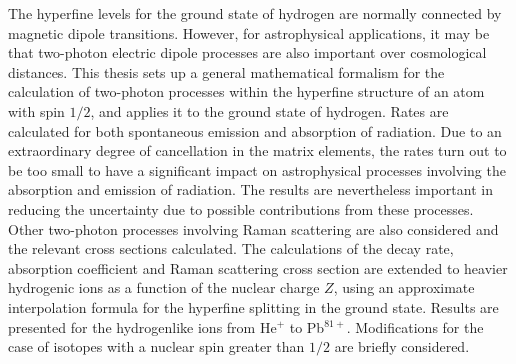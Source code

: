 \thispagestyle{plain}


The hyperfine levels for the ground state of hydrogen are normally connected by magnetic dipole transitions.  However, for astrophysical applications, it may be that two-photon electric dipole processes are also important over cosmological distances. This thesis sets up a general mathematical formalism for the calculation of two-photon processes within the hyperfine structure of an atom with spin $1/2$, and applies it to the ground state of hydrogen. Rates are calculated for both spontaneous emission and absorption of radiation. Due to an extraordinary degree of cancellation in the matrix elements, the rates turn out to be too small to have a significant impact on astrophysical processes involving the absorption and emission of radiation. The results are nevertheless important in reducing the uncertainty due to possible contributions from these processes.  Other two-photon processes involving Raman scattering are also considered and the relevant cross sections calculated. The calculations of the decay rate, absorption coefficient and Raman scattering cross section are extended to heavier hydrogenic ions as a function of the nuclear charge $Z$, using an approximate interpolation formula for the hyperfine splitting in the ground state. Results are presented for the hydrogenlike ions from He$^+$ to Pb$^{81+}$. Modifications for the case of isotopes with a nuclear spin greater than $1/2$ are briefly considered. 